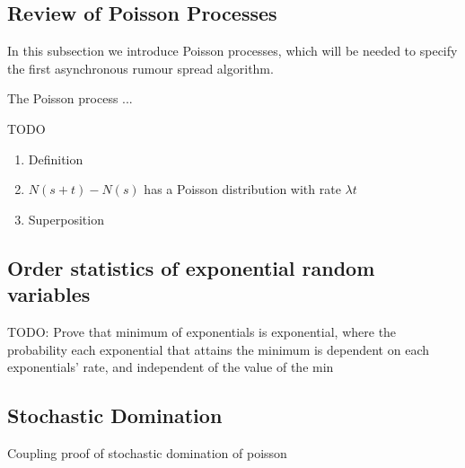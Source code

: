 \subsection{Review of Poisson Processes}

In this subsection we introduce Poisson processes, which will be needed to specify the first asynchronous rumour spread algorithm.

The Poisson process ...

TODO

\begin{enumerate}
	\item Definition
	\item $N(s + t) - N(s)$ has a Poisson distribution with rate $\lambda t$
	\item Superposition
\end{enumerate}


\subsection{Order statistics of exponential random variables}

TODO: Prove that minimum of exponentials is exponential, where the probability each exponential that attains the minimum is dependent on each exponentials' rate, and independent of the value of the min


\subsection{Stochastic Domination}
Coupling proof of stochastic domination of poisson



